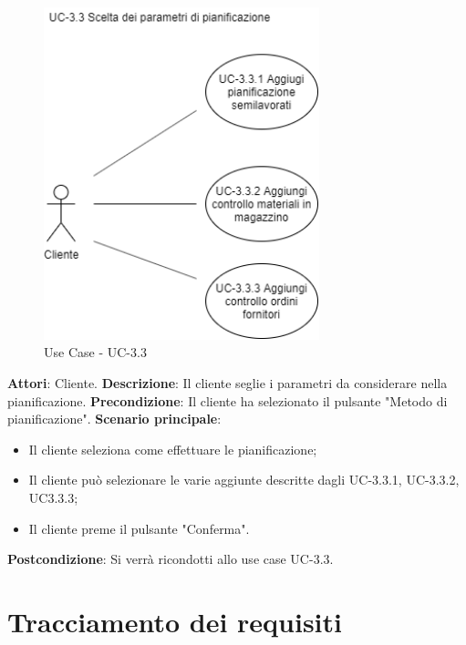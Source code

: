 \begin{figure}[H]
	\includegraphics[width=8cm]{immagini/UC2.png}
	\centering
	\caption{Use Case - UC-3.3}
\end{figure}

\textbf{Attori}: Cliente. \newline
\textbf{Descrizione}: Il cliente seglie i parametri da considerare nella pianificazione.\newline
\textbf{Precondizione}: Il cliente ha selezionato il pulsante "Metodo di pianificazione".\newline
\textbf{Scenario principale}: \begin{itemize}
    \item Il cliente seleziona come effettuare le pianificazione;
    \item Il cliente può selezionare le varie aggiunte descritte dagli UC-3.3.1, UC-3.3.2, UC3.3.3;
    \item Il cliente preme il pulsante "Conferma".
\end{itemize}
\textbf{Postcondizione}: Si verrà ricondotti allo use case UC-3.3.
\newpage
\section{Tracciamento dei requisiti}


